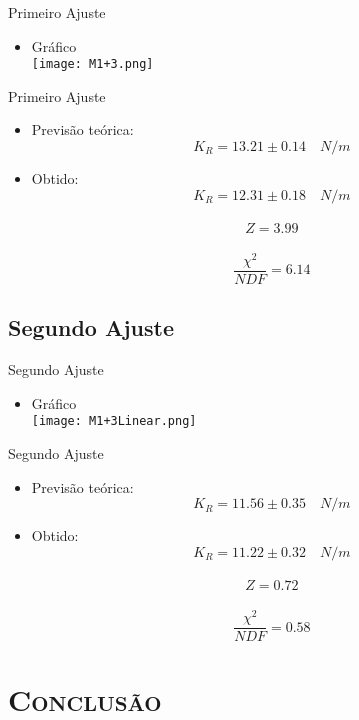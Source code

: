 \documentclass[xcolor=x11names,compress]{beamer}
\renewcommand{\(}{\begin{columns}}
\renewcommand{\)}{\end{columns}}
\newcommand{\<}[1]{\begin{column}{#1}}
\renewcommand{\>}{\end{column}}
\begin{document}
\begin{frame}{Primeiro Ajuste}
    \begin{itemize}
        \item Gráfico\\
            \texttt{[image: M1+3.png]}
    \end{itemize}
\end{frame}


\begin{frame}{Primeiro Ajuste}
    \begin{itemize}
        \item Previsão teórica: \[K_{R} = 13.21 \pm 0.14 \quad N/m\]
        \item Obtido: \[K_{R} = 12.31 \pm 0.18 \quad N/m\]\\
            \[Z = 3.99\]\\
            \[\frac{\chi^{2}}{NDF} = 6.14\]
    \end{itemize}
\end{frame}



\subsection{Segundo Ajuste}

\begin{frame}{Segundo Ajuste}
    \begin{itemize}
        \item Gráfico\\
            \texttt{[image: M1+3Linear.png]}
    \end{itemize}
\end{frame}


\begin{frame}{Segundo Ajuste}
    \begin{itemize}
        \item Previsão teórica: \[K_{R} = 11.56 \pm 0.35 \quad N/m\]
        \item Obtido: \[K_{R} = 11.22 \pm 0.32 \quad N/m\]\\
            \[Z = 0.72\]\\
            \[\frac{\chi^{2}}{NDF} = 0.58\]
    \end{itemize}
\end{frame}


\section{\scshape Conclusão}
\end{document}
